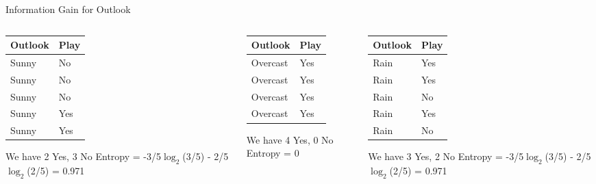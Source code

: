 \documentclass[usenames,dvipsnames]{beamer}
\begin{document}
\begin{frame}{Information Gain for Outlook}
\begin{columns}


\begin{column}{.32\textwidth}
	\begin{table}
\begin{tabular}{l|l} \toprule
	\textbf{Outlook} & \textbf{Play} \\ \midrule
	Sunny    & No   \\
	Sunny    & No   \\
	Sunny    & No   \\
	Sunny    & Yes  \\
	Sunny    & Yes  \\

\bottomrule
\end{tabular}
We have 2 Yes, 3 No
Entropy = -3/5$\log_{2}$(3/5) - 2/5$\log_{2}$(2/5) = 0.971
\end{table}
\end{column}

\pause \begin{column}{.32\textwidth}
	\begin{table}


\begin{tabular}{l|l} \toprule
	\textbf{Outlook} & \textbf{Play} \\ \midrule

	Overcast & Yes  \\
	Overcast & Yes  \\
	Overcast & Yes  \\
	Overcast & Yes  \\ \bottomrule

\end{tabular}
We have 4 Yes, 0 No
Entropy = 0


	\end{table}


\end{column}


\pause \begin{column}{.32\textwidth}
	\begin{table}
\begin{tabular}{l|l} \toprule
	\textbf{Outlook} & \textbf{Play} \\ \midrule
	Rain     & Yes  \\
	Rain     & Yes  \\
	Rain     & No   \\
	Rain     & Yes  \\
	Rain     & No  \\ \bottomrule
\end{tabular}
We have 3 Yes, 2 No
Entropy = -3/5$\log_{2}$(3/5) - 2/5$\log_{2}$(2/5) = 0.971
\end{table}
\end{column}
\end{columns}
\end{frame}
\end{document}

